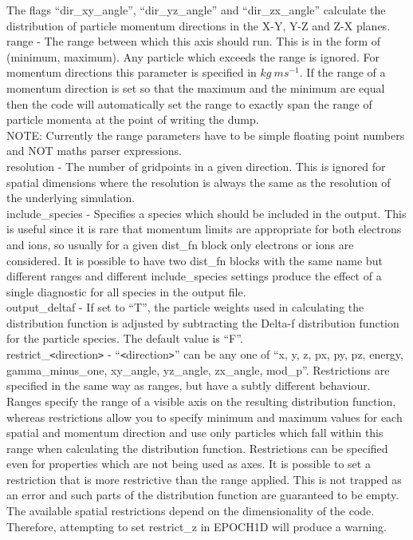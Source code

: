 The flags ``dir\_xy\_angle'', ``dir\_yz\_angle'' and
``dir\_zx\_angle'' calculate the distribution
of particle momentum directions in the X-Y, Y-Z and Z-X planes.\\

{\emphtext range} - The range between which this axis should
run. This is in the form of (minimum, maximum). Any particle which exceeds
the range is ignored.
For momentum directions this parameter is specified in
$kg\ ms^{-1}$. If the range of a momentum direction is set so that the maximum
and the minimum are equal then the code will automatically set the range to
exactly span the range of particle momenta at the point of writing the dump.\\

{\emphtext NOTE: Currently the range parameters have to be simple floating
point numbers and NOT maths parser expressions.}\\

{\emphtext resolution} - The number of gridpoints in a given
direction. This is ignored for spatial dimensions where the
resolution is always the same as the resolution of the underlying simulation.\\

{\emphtext include\_species} - Specifies a species which should be included
in the output. This is useful since it is rare that momentum limits are
appropriate for both electrons and ions, so usually for a given dist\_fn block
only electrons or ions are considered. It is possible to have two dist\_fn
blocks with the same name but different ranges and different
include\_species settings produce the effect of a single diagnostic for
all species in the output file.\\

{\emphtext output\_deltaf} - If set to ``T'', the particle weights used in
  calculating the distribution function is adjusted by subtracting the Delta-f
  distribution function for the particle species. The default value is ``F''.\\

{\emphtext restrict\_\verb|<|direction\verb|>|} - ``\verb|<|direction\verb|>|''
  can be any one of ``x, y, z, px, py, pz, energy, gamma\_minus\_one, xy\_angle,
  yz\_angle, zx\_angle, mod\_p''. Restrictions are specified in
  the same way as ranges, but have a subtly different behaviour. Ranges specify
  the range of a visible axis on the resulting distribution function, whereas
  restrictions allow you to specify minimum and maximum values for each
  spatial and momentum direction and use only particles which fall within this
  range when calculating the distribution function. Restrictions can be
  specified even
  for properties which are not being used as axes. It is possible to set a
  restriction that is more restrictive than the range applied. This is not
  trapped as an error and such parts of the distribution function are
  guaranteed to be empty. The available spatial restrictions depend on the
  dimensionality of the code. Therefore,
  attempting to set restrict\_z in EPOCH1D will produce a warning.\\

